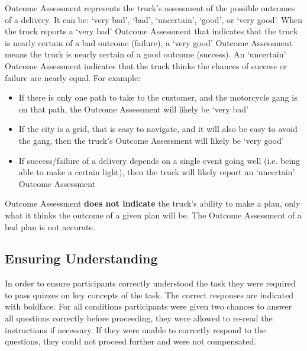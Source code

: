 \begin{quoting}
    Outcome Assessment represents the truck's assessment of the possible outcomes of a delivery. It can be: `very bad', `bad', `uncertain', `good', or `very good'. When the truck reports a `very bad' Outcome Assessment that indicates that the truck is nearly certain of a bad outcome (failure), a `very good' Outcome Assessment means the truck is nearly certain of a good outcome (success). An `uncertain' Outcome Assessment indicates that the truck thinks the chances of success or failure are nearly equal. For example:

    \begin{itemize}
        \item If there is only one path to take to the customer, and the motorcycle gang is on that path, the Outcome Assessment will likely be `very bad'
        \item If the city is a grid, that is easy to navigate, and it will also be easy to avoid the gang, then the truck's Outcome Assessment will likely be `very good'
        \item If success/failure of a delivery depends on a single event going well (i.e. being able to make a certain light), then the truck will likely report an `uncertain' Outcome Assessment
    \end{itemize}

    Outcome Assessment \textbf{does not indicate} the truck's ability to make a plan, only what it thinks the outcome of a given plan will be. The Outcome Assessment of a bad plan is not accurate.
\end{quoting}

\subsection{Ensuring Understanding} \label{sec:comprehension}
In order to ensure participants correctly understood the task they were required to pass quizzes on key concepts of the task. The correct responses are indicated with boldface. For all conditions participants were given two chances to answer all questions correctly before proceeding, they were allowed to re-read the instructions if necessary. If they were unable to correctly respond to the questions, they could not proceed further and were not compensated.


